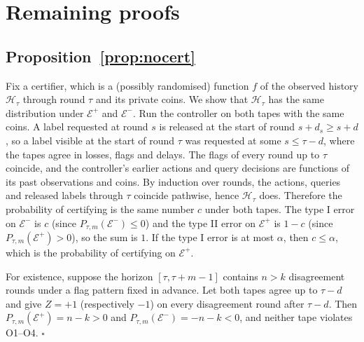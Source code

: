 \documentclass[10pt]{article}
\theoremstyle{plain}
\theoremstyle{definition}
\begin{document}
\section{Remaining proofs}\label{app:proofs}
\subsection{Proposition~\ref{prop:nocert}}
Fix a certifier, which is a (possibly randomised) function $f$ of the observed history $\mathcal H_\tau$ through round $\tau$ and its private coins. We show that $\mathcal H_\tau$ has the same distribution under $\mathcal E^+$ and $\mathcal E^-$. Run the controller on both tapes with the same coins. A label requested at round $s$ is released at the start of round $s+d_s\ge s+d$, so a label visible at the start of round $\tau$ was requested at some $s\le\tau-d$, where the tapes agree in losses, flags and delays. The flags of every round up to $\tau$ coincide, and the controller's earlier actions and query decisions are functions of its past observations and coins. By induction over rounds, the actions, queries and released labels through $\tau$ coincide pathwise, hence $\mathcal H_\tau$ does. Therefore the probability of certifying is the same number $c$ under both tapes. The type I error on $\mathcal E^-$ is $c$ (since $P_{\tau,m}(\mathcal E^-)\le0$) and the type II error on $\mathcal E^+$ is $1-c$ (since $P_{\tau,m}(\mathcal E^+)>0$), so the sum is $1$. If the type I error is at most $\alpha$, then $c\le\alpha$, which is the probability of certifying on $\mathcal E^+$.

For existence, suppose the horizon $[\tau,\tau+m-1]$ contains $n>k$ disagreement rounds under a flag pattern fixed in advance. Let both tapes agree up to $\tau-d$ and give $Z=+1$ (respectively $-1$) on every disagreement round after $\tau-d$. Then $P_{\tau,m}(\mathcal E^+)=n-k>0$ and $P_{\tau,m}(\mathcal E^-)=-n-k<0$, and neither tape violates O1--O4. $\square$
\end{document}
